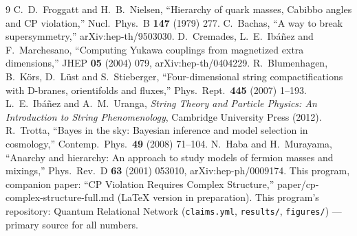 \documentclass[aps,prd,preprint,nofootinbib]{revtex4-2}
\begin{document}
\begin{thebibliography}{9}
 C.~D.~Froggatt and H.~B.~Nielsen, ``Hierarchy of quark masses, Cabibbo angles and CP violation,'' Nucl.\ Phys.\ B \textbf{147} (1979) 277.
 C.~Bachas, ``A way to break supersymmetry,'' arXiv:hep-th/9503030.
 D.~Cremades, L.~E.~Ib\'a\~nez and F.~Marchesano, ``Computing Yukawa couplings from magnetized extra dimensions,'' JHEP \textbf{05} (2004) 079, arXiv:hep-th/0404229.
 R.~Blumenhagen, B.~K\"ors, D.~L\"ust and S.~Stieberger, ``Four-dimensional string compactifications with D-branes, orientifolds and fluxes,'' Phys.\ Rept.\ \textbf{445} (2007) 1--193.
 L.~E.~Ib\'a\~nez and A.~M.~Uranga, \emph{String Theory and Particle Physics: An Introduction to String Phenomenology}, Cambridge University Press (2012).
 R.~Trotta, ``Bayes in the sky: Bayesian inference and model selection in cosmology,'' Contemp.\ Phys.\ \textbf{49} (2008) 71--104.
 N.~Haba and H.~Murayama, ``Anarchy and hierarchy: An approach to study models of fermion masses and mixings,'' Phys.\ Rev.\ D \textbf{63} (2001) 053010, arXiv:hep-ph/0009174.
 This program, companion paper: ``CP Violation Requires Complex Structure,'' paper/cp-complex-structure-full.md (LaTeX version in preparation).
 This program's repository: Quantum Relational Network (\texttt{claims.yml}, \texttt{results/}, \texttt{figures/}) --- primary source for all numbers.
\end{thebibliography}
\end{document}
